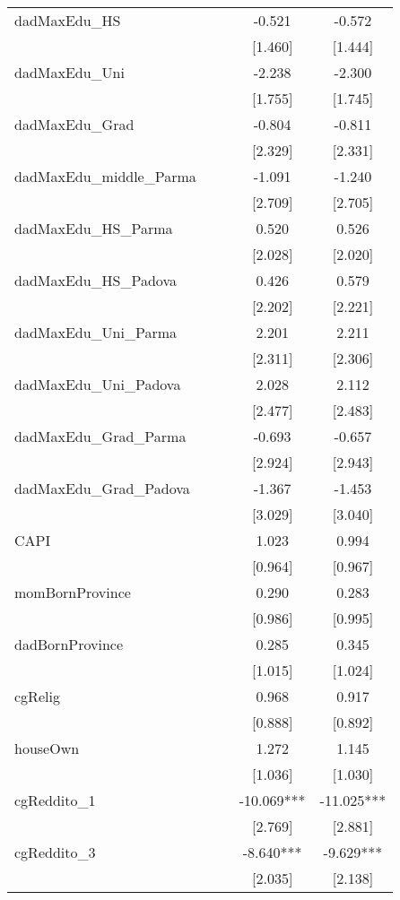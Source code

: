 \documentclass[]{article}
\begin{document}
\begin{tabular}{lcccc}
dadMaxEdu\_HS &  &  & -0.521 & -0.572 \\
 &  &  & [1.460] & [1.444] \\
dadMaxEdu\_Uni &  &  & -2.238 & -2.300 \\
 &  &  & [1.755] & [1.745] \\
dadMaxEdu\_Grad &  &  & -0.804 & -0.811 \\
 &  &  & [2.329] & [2.331] \\
dadMaxEdu\_middle\_Parma &  &  & -1.091 & -1.240 \\
 &  &  & [2.709] & [2.705] \\
dadMaxEdu\_HS\_Parma &  &  & 0.520 & 0.526 \\
 &  &  & [2.028] & [2.020] \\
dadMaxEdu\_HS\_Padova &  &  & 0.426 & 0.579 \\
 &  &  & [2.202] & [2.221] \\
dadMaxEdu\_Uni\_Parma &  &  & 2.201 & 2.211 \\
 &  &  & [2.311] & [2.306] \\
dadMaxEdu\_Uni\_Padova &  &  & 2.028 & 2.112 \\
 &  &  & [2.477] & [2.483] \\
dadMaxEdu\_Grad\_Parma &  &  & -0.693 & -0.657 \\
 &  &  & [2.924] & [2.943] \\
dadMaxEdu\_Grad\_Padova &  &  & -1.367 & -1.453 \\
 &  &  & [3.029] & [3.040] \\
CAPI &  &  & 1.023 & 0.994 \\
 &  &  & [0.964] & [0.967] \\
momBornProvince &  &  & 0.290 & 0.283 \\
 &  &  & [0.986] & [0.995] \\
dadBornProvince &  &  & 0.285 & 0.345 \\
 &  &  & [1.015] & [1.024] \\
cgRelig &  &  & 0.968 & 0.917 \\
 &  &  & [0.888] & [0.892] \\
houseOwn &  &  & 1.272 & 1.145 \\
 &  &  & [1.036] & [1.030] \\
cgReddito\_1 &  &  & -10.069*** & -11.025*** \\
 &  &  & [2.769] & [2.881] \\
cgReddito\_3 &  &  & -8.640*** & -9.629*** \\
 &  &  & [2.035] & [2.138] \\

\end{tabular}
\end{document}
